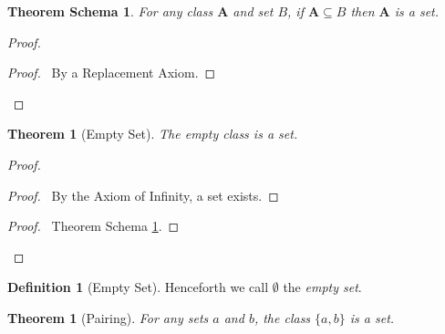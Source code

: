 \documentclass{report}
\let\qed\relax
\newtheorem{theorem}[axiom]{Theorem}
\newtheorem{thms}[axiom]{Theorem Schema}
\theoremstyle{definition}
\newtheorem{definition}[axiom]{Definition}
\begin{document}
    \begin{thms}
        \label{theorem:subset_axiom}
        For any class $\mathbf{A}$ and set $B$, if $\mathbf{A} \subseteq B$ then $\mathbf{A}$ is a set.
    \end{thms}

    \begin{proof}
        \pf
        \begin{proof}
            \pf\ By a Replacement Axiom.
        \end{proof}
        \qed
    \end{proof}

    \begin{theorem}[Empty Set]
        The empty class is a set.
    \end{theorem}

    \begin{proof}
        \pf
        \begin{proof}
            \pf\ By the Axiom of Infinity, a set exists.
        \end{proof}
        \begin{proof}
            \pf\ Theorem Schema \ref{theorem:subset_axiom}.
        \end{proof}
        \qed
    \end{proof}

    \begin{definition}[Empty Set]
        Henceforth we call $\emptyset$ the \emph{empty set}.
    \end{definition}

    \begin{theorem}[Pairing]
        For any sets $a$ and $b$, the class $\{a,b\}$ is a set.
    \end{theorem}
\end{document}
